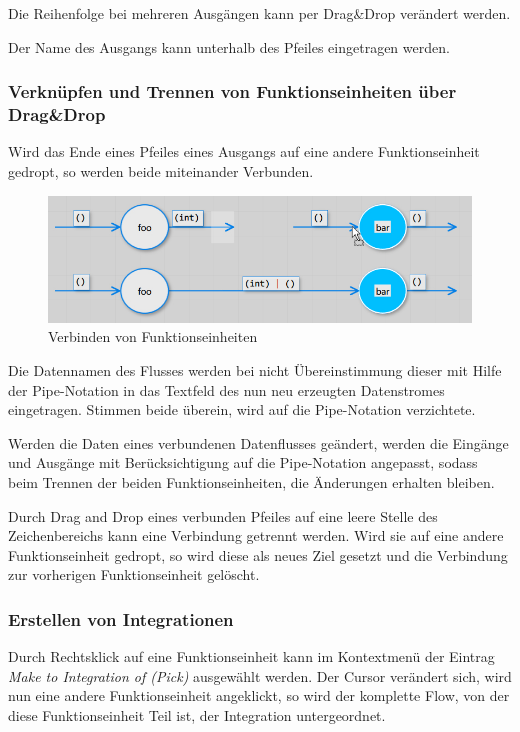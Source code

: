 	Die Reihenfolge bei mehreren Ausgängen kann per Drag\&Drop verändert werden.
	
	Der Name des Ausgangs kann unterhalb des Pfeiles eingetragen werden.
	
\subsubsection{Verknüpfen und Trennen von Funktionseinheiten über Drag\&Drop }

	Wird das Ende eines Pfeiles eines Ausgangs auf eine andere Funktionseinheit gedropt, so werden beide
	miteinander Verbunden. 
	
	\begin{figure}[H]
		\centering
		\includegraphics[width=1\linewidth]{./img/dragdrop.jpg} 
		\caption{Verbinden von Funktionseinheiten}
	\end{figure}
	
	
	
	
	Die Datennamen des Flusses werden bei nicht
	Übereinstimmung dieser mit Hilfe der Pipe-Notation in das Textfeld des nun neu
	erzeugten Datenstromes eingetragen. Stimmen beide überein, wird auf die Pipe-Notation
	verzichtete.
	
	
	
	Werden die Daten eines verbundenen Datenflusses geändert, werden die Eingänge
	und Ausgänge mit Berücksichtigung auf die Pipe-Notation angepasst, sodass
	beim Trennen der beiden Funktionseinheiten, die Änderungen erhalten bleiben.
	
	Durch Drag and Drop eines verbunden Pfeiles auf eine leere Stelle des
	Zeichenbereichs kann eine Verbindung getrennt werden. Wird sie auf eine
	andere Funktionseinheit gedropt, so wird diese als neues Ziel gesetzt und die 
	Verbindung zur vorherigen Funktionseinheit gelöscht. 
	
\subsubsection{Erstellen von Integrationen}

	Durch Rechtsklick auf eine Funktionseinheit kann im Kontextmenü der Eintrag
	\textit{Make to Integration of (Pick)} ausgewählt werden. Der Cursor verändert
	sich, wird nun eine andere Funktionseinheit angeklickt, so wird der
	komplette Flow, von der diese Funktionseinheit Teil ist, der Integration untergeordnet.
	
